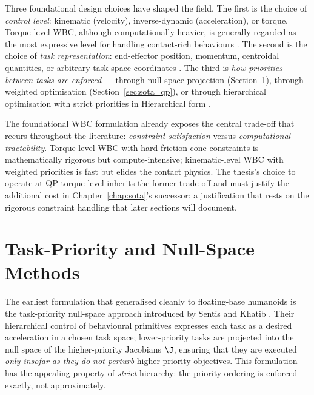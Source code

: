 Three foundational design choices have shaped the field. The first is
the choice of \emph{control level}: kinematic (velocity),
inverse-dynamic (acceleration), or torque. Torque-level WBC, although
computationally heavier, is generally regarded as the most expressive
level for handling contact-rich behaviours \cite{Wensing2013}. The
second is the choice of \emph{task representation}: end-effector
position, momentum, centroidal quantities, or arbitrary task-space
coordinates \cite{Koolen2016}. The third is \emph{how priorities
between tasks are enforced} --- through null-space projection
(Section~\ref{sec:sota_nullspace}), through weighted optimisation
(Section~\ref{sec:sota_qp}), or through hierarchical optimisation with
strict priorities in Hierarchical \QP{} form
\cite{Sentis2005,Wensing2013,Koolen2016,EscandeMansard2014}.

\begin{criticalinsight}
The foundational WBC formulation already exposes the central trade-off
that recurs throughout the literature: \emph{constraint satisfaction}
versus \emph{computational tractability}. Torque-level WBC with hard
friction-cone constraints is mathematically rigorous but compute-intensive;
kinematic-level WBC with weighted priorities is fast but elides the
contact physics. The thesis's choice to operate at QP-torque level inherits
the former trade-off and must justify the additional cost in
Chapter~\ref{chap:sota}'s successor: a justification that rests on the
rigorous constraint handling that later sections will document.
\end{criticalinsight}


\section{Task-Priority and Null-Space Methods}
\label{sec:sota_nullspace}

The earliest \WBC{} formulation that generalised cleanly to floating-base
humanoids is the task-priority null-space approach introduced by
Sentis and Khatib \cite{Sentis2005}. Their hierarchical control of
behavioural primitives expresses each task as a desired acceleration in
a chosen task space; lower-priority tasks are projected into the null
space of the higher-priority Jacobians $\J$, ensuring that they are
executed \emph{only insofar as they do not perturb} higher-priority
objectives. This formulation has the appealing property of \emph{strict}
hierarchy: the priority ordering is enforced exactly, not approximately.

